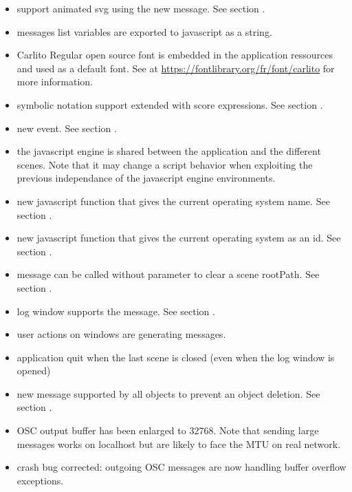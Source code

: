 \begin{itemize}
\item support animated svg using the new  message. See section .
\item messages list variables are exported to javascript as a string.
\item Carlito Regular open source font is embedded in the application ressources and used as a default font. See at \url{https://fontlibrary.org/fr/font/carlito} for more information.
\item symbolic notation support extended with score expressions. See section .
\item new  event. See section .
\item the javascript engine is shared between the application and the different scenes.
  Note that it may change a script behavior when exploiting the previous independance
  of the javascript engine environments.
\item new javascript  function that gives the current operating system name. See section .
\item new javascript  function that gives the current operating system as an id. See section .
\item {} message can be called without parameter to clear a scene rootPath. See section .
\item log window supports the  message. See section .
\item user actions on windows are generating  messages.
\item application quit when the last scene is closed (even when the log window is opened) 
\item new  message supported by all objects to prevent an object deletion. See section .
\item OSC output buffer has been enlarged to 32768. Note that sending large messages works on localhost but are likely to face the MTU on real network. 
\item crash bug corrected: outgoing OSC messages are now handling buffer overflow exceptions.


\end{itemize}
